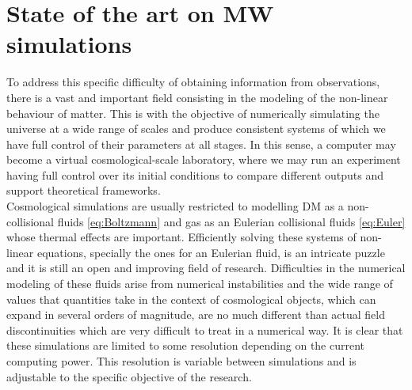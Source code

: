 \section{State of the art on MW simulations}
To address this specific difficulty of obtaining information from observations, there is a vast and important field consisting in the modeling of the non-linear behaviour of matter. 
This is with the objective of numerically simulating the universe at a wide range of scales and produce consistent systems of which we have  full control of their parameters at all stages. 
In this sense, a computer may become a virtual cosmological-scale laboratory, where we may run an experiment having full control over its initial conditions to compare different outputs and support theoretical frameworks. \\


Cosmological simulations are usually restricted to modelling DM as a non-collisional fluids \eqref{eq:Boltzmann} and gas as an Eulerian collisional fluids \eqref{eq:Euler} whose thermal effects are important.  Efficiently solving these systems of non-linear equations, specially the ones for an Eulerian fluid, is an intricate puzzle and it is still an open and improving field of research. 
Difficulties in the numerical modeling of these fluids arise from numerical instabilities and the wide range of values that quantities take in the context of cosmological objects, which can expand in several orders of magnitude, are no much different than actual field discontinuities which are very difficult to treat in a numerical way. It is clear that these simulations are limited to some resolution depending on the current computing power. This resolution is variable between simulations and is adjustable to the specific objective of the research.\\



